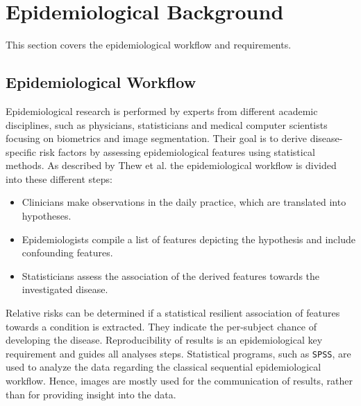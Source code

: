 \documentclass[journal]{style/vgtc} 			          %
\begin{document}
\section{Epidemiological Background} \label{sec:Background}
This section covers the epidemiological workflow and requirements.
\subsection{Epidemiological Workflow} \label{EpidemiologicalWorkflow}
Epidemiological research is performed by experts from different academic disciplines, such as physicians, statisticians and medical computer scientists focusing on biometrics and image segmentation.
Their goal is to derive disease-specific risk factors by assessing epidemiological features using statistical methods.
As described by Thew et al. \cite{Thew2009} the epidemiological workflow is divided into these different steps:
\begin{itemize}
	\item Clinicians make observations in the daily practice, which are translated into hypotheses.
	\item Epidemiologists compile a list of features depicting the hypothesis and include confounding features.
	\item Statisticians assess the association of the derived features towards the investigated disease.
\end{itemize}
Relative risks can be determined if a statistical resilient association of features towards a condition is extracted.
They indicate the per-subject chance of developing the disease.
Reproducibility of results is an epidemiological key requirement and guides all analyses steps.
Statistical programs, such as \texttt{SPSS}, are used to analyze the data regarding the classical sequential epidemiological workflow. Hence, images are mostly used for the communication of results, rather than for providing insight into the data.
\end{document}

